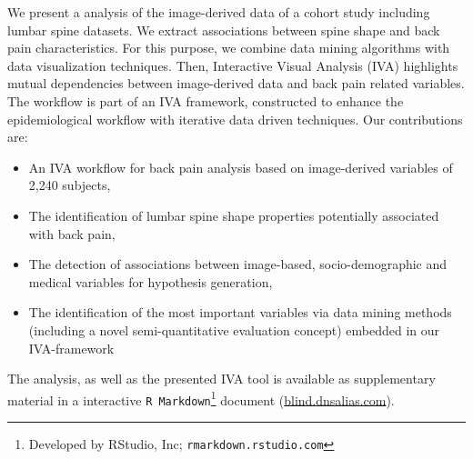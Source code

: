 \documentclass[a4paper,twoside]{style/article}
\begin{document}
We present a analysis of the image-derived data of a cohort study including lumbar spine datasets.
We extract associations between spine shape and back pain characteristics.
For this purpose, we combine data mining algorithms with data visualization techniques.
Then, Interactive Visual Analysis (IVA) highlights mutual dependencies between image-derived data and back pain related variables.
The workflow is part of an IVA framework, constructed to enhance the epidemiological workflow with iterative data driven techniques.
Our contributions are:
\begin{itemize}
\item An IVA workflow for back pain analysis based on image-derived variables of 2,240 subjects,
\item The identification of lumbar spine shape properties potentially associated with back pain,
\item The detection of associations between image-based, socio-demographic and medical variables for hypothesis generation,
\item The identification of the most important variables via data mining methods (including a novel semi-quantitative evaluation concept) embedded in our IVA-framework
\end{itemize}
The analysis, as well as the presented IVA tool is available as supplementary material in a interactive \texttt{R Markdown}\footnote{Developed by RStudio, Inc; \texttt{rmarkdown.rstudio.com}} document (\url{blind.dnsalias.com}).
\end{document}
